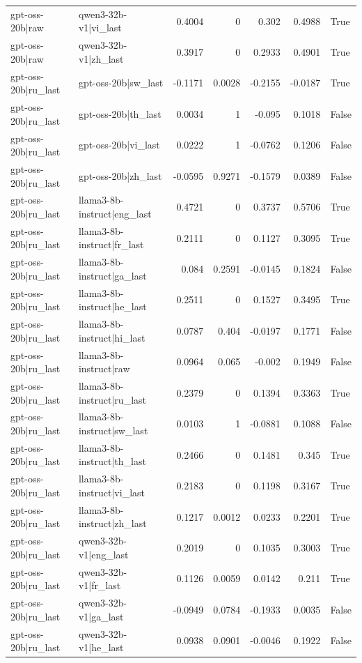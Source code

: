 \begin{table}
\begin{tabular}{l l r r r r l}
gpt-oss-20b|raw & qwen3-32b-v1|vi_last & 0.4004 & 0 & 0.302 & 0.4988 & True \\
gpt-oss-20b|raw & qwen3-32b-v1|zh_last & 0.3917 & 0 & 0.2933 & 0.4901 & True \\
gpt-oss-20b|ru_last & gpt-oss-20b|sw_last & -0.1171 & 0.0028 & -0.2155 & -0.0187 & True \\
gpt-oss-20b|ru_last & gpt-oss-20b|th_last & 0.0034 & 1 & -0.095 & 0.1018 & False \\
gpt-oss-20b|ru_last & gpt-oss-20b|vi_last & 0.0222 & 1 & -0.0762 & 0.1206 & False \\
gpt-oss-20b|ru_last & gpt-oss-20b|zh_last & -0.0595 & 0.9271 & -0.1579 & 0.0389 & False \\
gpt-oss-20b|ru_last & llama3-8b-instruct|eng_last & 0.4721 & 0 & 0.3737 & 0.5706 & True \\
gpt-oss-20b|ru_last & llama3-8b-instruct|fr_last & 0.2111 & 0 & 0.1127 & 0.3095 & True \\
gpt-oss-20b|ru_last & llama3-8b-instruct|ga_last & 0.084 & 0.2591 & -0.0145 & 0.1824 & False \\
gpt-oss-20b|ru_last & llama3-8b-instruct|he_last & 0.2511 & 0 & 0.1527 & 0.3495 & True \\
gpt-oss-20b|ru_last & llama3-8b-instruct|hi_last & 0.0787 & 0.404 & -0.0197 & 0.1771 & False \\
gpt-oss-20b|ru_last & llama3-8b-instruct|raw & 0.0964 & 0.065 & -0.002 & 0.1949 & False \\
gpt-oss-20b|ru_last & llama3-8b-instruct|ru_last & 0.2379 & 0 & 0.1394 & 0.3363 & True \\
gpt-oss-20b|ru_last & llama3-8b-instruct|sw_last & 0.0103 & 1 & -0.0881 & 0.1088 & False \\
gpt-oss-20b|ru_last & llama3-8b-instruct|th_last & 0.2466 & 0 & 0.1481 & 0.345 & True \\
gpt-oss-20b|ru_last & llama3-8b-instruct|vi_last & 0.2183 & 0 & 0.1198 & 0.3167 & True \\
gpt-oss-20b|ru_last & llama3-8b-instruct|zh_last & 0.1217 & 0.0012 & 0.0233 & 0.2201 & True \\
gpt-oss-20b|ru_last & qwen3-32b-v1|eng_last & 0.2019 & 0 & 0.1035 & 0.3003 & True \\
gpt-oss-20b|ru_last & qwen3-32b-v1|fr_last & 0.1126 & 0.0059 & 0.0142 & 0.211 & True \\
gpt-oss-20b|ru_last & qwen3-32b-v1|ga_last & -0.0949 & 0.0784 & -0.1933 & 0.0035 & False \\
gpt-oss-20b|ru_last & qwen3-32b-v1|he_last & 0.0938 & 0.0901 & -0.0046 & 0.1922 & False \\

\end{tabular}
\end{table}
